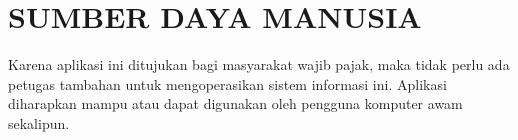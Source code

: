 \chapter{SUMBER DAYA MANUSIA}

Karena aplikasi ini ditujukan bagi masyarakat wajib pajak, maka tidak perlu ada petugas tambahan untuk mengoperasikan sistem informasi ini. Aplikasi diharapkan mampu atau dapat digunakan oleh pengguna komputer awam sekalipun.